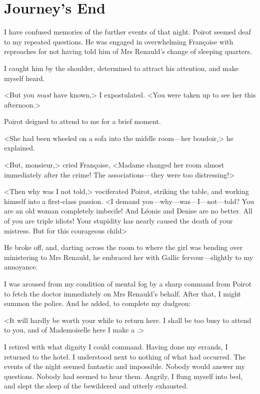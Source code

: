 \chapter{Journey's End}

\lettrine{I}{} have confused memories of the further events of that night. Poirot seemed deaf to my repeated questions. He was engaged in overwhelming Françoise with reproaches for not having told him of Mrs Renauld's change of sleeping quarters. 

 I caught him by the shoulder, determined to attract his attention, and make myself heard. 

 <But you \emph{must} have known,> I expostulated. <You were taken up to see her this afternoon.> 

 Poirot deigned to attend to me for a brief moment. 

 <She had been wheeled on a sofa into the middle room—her boudoir,> he explained. 

 <But, monsieur,> cried Françoise, <Madame changed her room almost immediately after the crime! The associations—they were too distressing!> 

 <Then why was I not told,> vociferated Poirot, striking the table, and working himself into a first-class passion. <I demand you—why—was—I—not—told? You are an old woman completely imbecile! And Léonie and Denise are no better. All of you are triple idiots! Your stupidity has nearly caused the death of your mistress. But for this courageous child\longdash> 

 He broke off, and, darting across the room to where the girl was bending over ministering to Mrs Renauld, he embraced her with Gallic fervour—slightly to my annoyance. 

 I was aroused from my condition of mental fog by a sharp command from Poirot to fetch the doctor immediately on Mrs Renauld's behalf. After that, I might summon the police. And he added, to complete my dudgeon: 

 <It will hardly be worth your while to return here. I shall be too busy to attend to you, and of Mademoiselle here I make a .> 

 I retired with what dignity I could command. Having done my errands, I returned to the hotel. I understood next to nothing of what had occurred. The events of the night seemed fantastic and impossible. Nobody would answer my questions. Nobody had seemed to hear them. Angrily, I flung myself into bed, and slept the sleep of the bewildered and utterly exhausted. 

